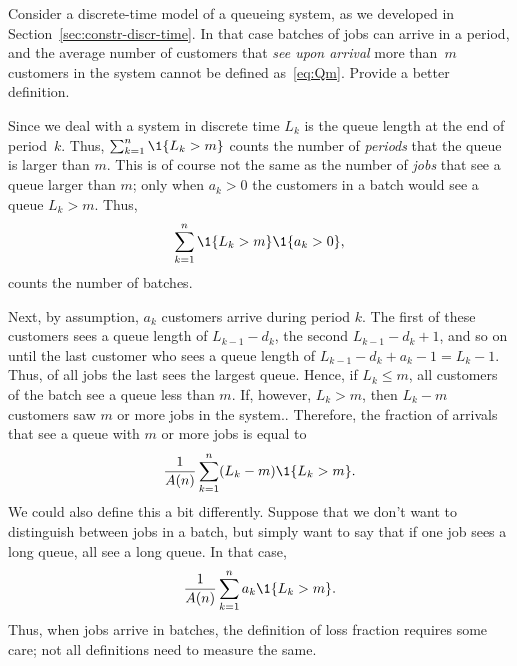 \begin{question}
  Consider a discrete-time model of a queueing system, as we developed
  in Section~\ref{sec:constr-discr-time}.  In that case batches of
  jobs can arrive in a period, and the average number of customers
  that \emph{see upon arrival} more than~$m$ customers in the system
  cannot be defined as~\eqref{eq:Qm}. Provide a better definition. 


  \begin{solution} Since we deal with a system in discrete time $L_k$
    is the queue length at the end of period~$k$. Thus,
    $\sum_{k=1}^n \1{L_k > m}$ counts the number of \emph{periods}
    that the queue is larger than $m$. This is of course not the same
    as the number of \emph{jobs} that see a queue larger than $m$;
    only when $a_k>0$ the customers in a batch would see a queue
    $L_k>m$. Thus,
    \begin{equation*}
      \sum_{k=1}^n \1{L_k > m} \1{a_k > 0},
    \end{equation*}
    counts the number of batches. 

    Next, by assumption, $a_k$ customers arrive during period $k$. The
    first of these customers sees a queue length of $L_{k-1} - d_k$,
    the second $L_{k-1}-d_k + 1$, and so on until the last customer
    who sees a queue length of $L_{k-1} - d_k + a_k -1 = L_k
    -1$.
    Thus, of all jobs the last sees the largest queue. Hence, if
    $L_k \leq m$, all customers of the batch see a queue less than
    $m$. If, however, $L_k > m$, then $L_k -m$ customers saw $m$ or
    more jobs in the system.. Therefore, the fraction of arrivals that
    see a queue with $m$ or more jobs is equal to
\begin{equation*}
  \frac 1 {A(n)} \sum_{k=1}^n (L_k - m) \1{L_k > m} .
\end{equation*}
We could also define this a bit differently. Suppose that we don't
want to distinguish between jobs in a batch, but simply want to say
that if one job sees a long queue, all see a long queue. In that case,
\begin{equation*}
\frac 1{A(n)}\sum_{k=1}^n a_k \1{L_k > m}.
\end{equation*}
Thus, when jobs arrive in batches, the definition of loss fraction
requires some care; not all definitions need to measure the same.
  \end{solution}
\end{question}





